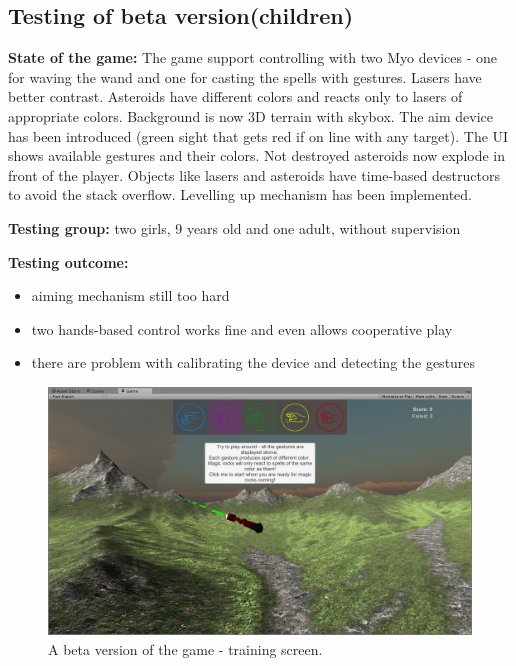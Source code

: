 \subsection{Testing of beta version(children)}


\textbf{State of the game:} The game support controlling with two Myo devices - one for waving the wand and one for casting the spells with gestures. Lasers have better contrast. Asteroids have different colors and reacts only to lasers of appropriate colors. Background is now 3D terrain with skybox. The aim device has been introduced (green sight that gets red if on line with any target). The UI shows available gestures and their colors. Not destroyed asteroids now explode in front of the player. Objects like lasers and asteroids have time-based destructors to avoid the stack overflow. Levelling up mechanism has been implemented.

\textbf{Testing group:} two girls, 9 years old and one adult, without supervision

\textbf{Testing outcome:}

\begin{itemize}
\item aiming mechanism still too hard
\item two hands-based control works fine and even allows cooperative play
\item there are problem with calibrating the device and detecting the gestures
\end{itemize}

\begin{figure}
\includegraphics[width=\textwidth]{graphics/screen_v2a.png} 
\caption{A beta version of the game - training screen.}
\end{figure}

